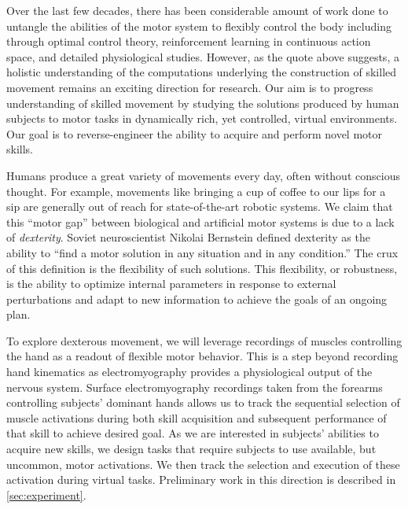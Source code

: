 \documentclass[../main.tex]{subfiles}
\begin{document}
Over the last few decades, there has been considerable amount of work done to untangle the abilities of the motor system to flexibly control the body including through optimal control theory\cite{Todorov2004}, reinforcement learning in continuous action space\cite{koberReinforcementLearningRobotics2013}, and detailed physiological studies\cite{sauerbreiCorticalPatternGeneration2019}. However, as the quote above suggests, a holistic understanding of the computations underlying the construction of skilled movement remains an exciting direction for research. Our aim is to progress understanding of skilled movement by studying the solutions produced by human subjects to motor tasks in dynamically rich, yet controlled, virtual environments. Our goal is to reverse-engineer the ability to acquire and perform novel motor skills.

Humans produce a great variety of movements every day, often without conscious thought. For example, movements like bringing a cup of coffee to our lips for a sip are generally out of reach for state-of-the-art robotic systems. We claim that this ``motor gap'' between biological and artificial motor systems is due to a lack of \emph{dexterity}. Soviet neuroscientist Nikolai Bernstein defined dexterity as the ability to ``find a motor solution in any situation and in any condition.''\cite{Bernstein1967} The crux of this definition is the flexibility of such solutions. This flexibility, or robustness\cite{kitanoBiologicalRobustness2004}, is the ability to optimize internal parameters in response to external perturbations and adapt to new information to achieve the goals of an ongoing plan.

To explore dexterous movement, we will leverage recordings of muscles controlling the hand as a readout of flexible motor behavior. This is a step beyond recording hand kinematics as electromyography provides a physiological output of the nervous system. Surface electromyography recordings taken from the forearms controlling subjects' dominant hands allows us to track the sequential selection of muscle activations during both skill acquisition and subsequent performance of that skill to achieve desired goal. As we are interested in subjects' abilities to acquire new skills, we design tasks that require subjects to use available, but uncommon, motor activations. We then track the selection and execution of these activation during virtual tasks. Preliminary work in this direction is described in \cref{sec:experiment}.
\end{document}
